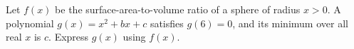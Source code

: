 Let $ f(x)$ be the surface-area-to-volume ratio of a sphere of radius $ x>0 $. A polynomial $ g(x)=x^2+bx+c $ satisfies $ g(6)=0 $, and its minimum over all real $ x $ is $ c $. Express $ g(x)$ using $ f(x)$.

